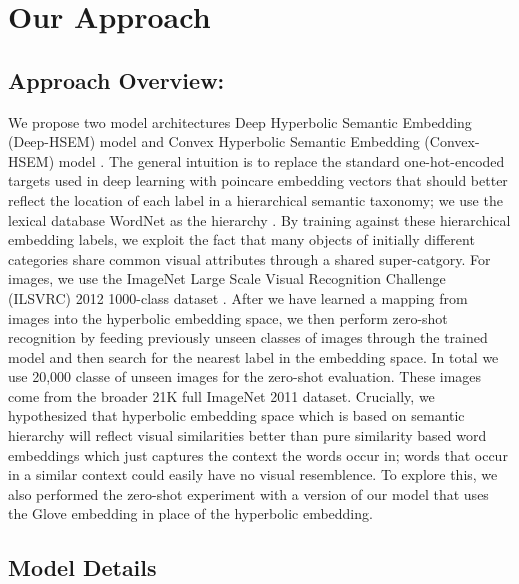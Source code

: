 \documentclass[12pt]{report}
\begin{document}
\chapter{Our Approach}

\section{Approach Overview:}
We propose two model architectures Deep Hyperbolic Semantic Embedding (Deep-HSEM) model  and Convex Hyperbolic Semantic Embedding (Convex-HSEM) model . The general intuition is to replace the standard one-hot-encoded targets used in deep learning with poincare embedding vectors that should better reflect the location of each label in a hierarchical semantic taxonomy; we use the lexical database WordNet as the hierarchy \cite{Miller1995}. By training against these hierarchical embedding labels, we exploit the fact that many objects of initially different categories share common visual attributes through a shared super-catgory. For images, we use the ImageNet Large Scale Visual Recognition Challenge (ILSVRC) 2012 1000-class dataset \cite{JiaDeng2009}. After we have learned a mapping from images into the hyperbolic embedding space, we then perform zero-shot recognition by feeding previously unseen classes of images through the trained model and then search for the nearest label in the embedding space. In total we use 20,000 classe of unseen images for the zero-shot evaluation. These images come from the broader 21K full ImageNet 2011 dataset. Crucially, we hypothesized that hyperbolic embedding space which is based on semantic hierarchy will reflect visual similarities better than pure similarity based word embeddings which just captures the context the words occur in; words that occur in a similar context could easily have no visual resemblence. To explore this, we also performed the zero-shot experiment with a version of our model that uses the Glove embedding in place of the hyperbolic embedding.

\section{Model Details}
\end{document}

